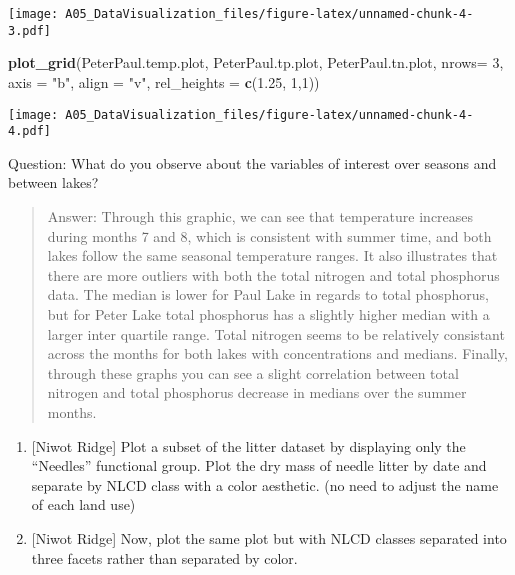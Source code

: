 \documentclass[]{article}
\newenvironment{Shaded}{\begin{snugshade}}{\end{snugshade}}
\newcommand{\DataTypeTok}[1]{\textcolor[rgb]{0.13,0.29,0.53}{#1}}
\newcommand{\DecValTok}[1]{\textcolor[rgb]{0.00,0.00,0.81}{#1}}
\newcommand{\FloatTok}[1]{\textcolor[rgb]{0.00,0.00,0.81}{#1}}
\newcommand{\KeywordTok}[1]{\textcolor[rgb]{0.13,0.29,0.53}{\textbf{#1}}}
\newcommand{\NormalTok}[1]{#1}
\newcommand{\StringTok}[1]{\textcolor[rgb]{0.31,0.60,0.02}{#1}}
\begin{document}
\texttt{[image: A05\_DataVisualization\_files/figure-latex/unnamed-chunk-4-3.pdf]}

\begin{Shaded}
\begin{Highlighting}[]
\KeywordTok{plot_grid}\NormalTok{(PeterPaul.temp.plot, PeterPaul.tp.plot, PeterPaul.tn.plot, }\DataTypeTok{nrows=} \DecValTok{3}\NormalTok{, }\DataTypeTok{axis =} \StringTok{"b"}\NormalTok{, }\DataTypeTok{align =} \StringTok{"v"}\NormalTok{, }\DataTypeTok{rel_heights =} \KeywordTok{c}\NormalTok{(}\FloatTok{1.25}\NormalTok{, }\DecValTok{1}\NormalTok{,}\DecValTok{1}\NormalTok{))}
\end{Highlighting}
\end{Shaded}

\texttt{[image: A05\_DataVisualization\_files/figure-latex/unnamed-chunk-4-4.pdf]}

Question: What do you observe about the variables of interest over
seasons and between lakes?

\begin{quote}
Answer: Through this graphic, we can see that temperature increases
during months 7 and 8, which is consistent with summer time, and both
lakes follow the same seasonal temperature ranges. It also illustrates
that there are more outliers with both the total nitrogen and total
phosphorus data. The median is lower for Paul Lake in regards to total
phosphorus, but for Peter Lake total phosphorus has a slightly higher
median with a larger inter quartile range. Total nitrogen seems to be
relatively consistant across the months for both lakes with
concentrations and medians. Finally, through these graphs you can see a
slight correlation between total nitrogen and total phosphorus decrease
in medians over the summer months.
\end{quote}

\begin{enumerate}
\def\labelenumi{\arabic{enumi}.}
\setcounter{enumi}{5}
\item
  {[}Niwot Ridge{]} Plot a subset of the litter dataset by displaying
  only the ``Needles'' functional group. Plot the dry mass of needle
  litter by date and separate by NLCD class with a color aesthetic. (no
  need to adjust the name of each land use)
\item
  {[}Niwot Ridge{]} Now, plot the same plot but with NLCD classes
  separated into three facets rather than separated by color.
\end{enumerate}
\end{document}

